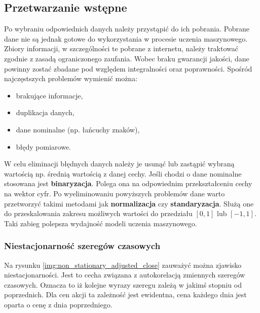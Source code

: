 \documentclass[a4paper, twoside, 11pt, openright]{article}
\begin{document}
\subsection{Przetwarzanie wstępne}

Po wybraniu odpowiednich danych należy przystąpić do ich pobrania. Pobrane dane nie są jednak gotowe do wykorzystania w procesie uczenia maszynowego. Zbiory informacji, w szczególności te pobrane z internetu, należy traktować zgodnie z zasadą ograniczonego zaufania. Wobec braku gwarancji jakości, dane powinny zostać zbadane pod względem integralności oraz poprawności. Spośród najczęstszych problemów wymienić można: 
\begin{itemize}
    \item brakujące informacje,
    \item duplikacja danych,
    \item dane nominalne (np. łańcuchy znaków),
    \item błędy pomiarowe.
\end{itemize}
W celu eliminacji błędnych danych należy je usunąć lub zastąpić wybraną wartością np. średnią wartością z danej cechy. Jeśli chodzi o dane nominalne stosowana jest \textbf{binaryzacja}. Polega ona na odpowiednim przekształceniu cechy na wektor cyfr. Po wyeliminowaniu powyższych problemów dane warto przetworzyć takimi metodami jak \textbf{normalizacja} czy \textbf{standaryzacja}. Służą one do przeskalowania zakresu możliwych wartości do przedziału $[0,1]$ lub $[-1,1]$. Taki zabieg polepsza wydajność modeli uczenia maszynowego.

\bigskip

\subsubsection{Niestacjonarność szeregów czasowych}

Na rysunku \ref{img:non_stationary_adjusted_close} zauważyć można zjawisko niestacjonarności. Jest to cecha związana z autokorelacją zmiennych szeregów czasowych. Oznacza to iż kolejne wyrazy szeregu zależą w jakimś stopniu od poprzednich. Dla cen akcji ta zależność jest ewidentna, cena każdego dnia jest oparta o cenę z dnia poprzedniego. 
\end{document}
